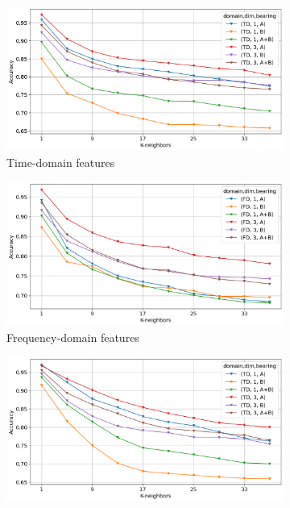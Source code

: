 \begin{figure}[h]
    \centering
    \begin{subfigure}[b]{0.48\textwidth}
        \includegraphics[width=\textwidth]{assets/results/all-features/TD.png}
        \caption{Time-domain features}
    \end{subfigure}
    \hfill
    \begin{subfigure}[b]{0.48\textwidth}
        \includegraphics[width=\textwidth]{assets/results/all-features/FD.png}
        \caption{Frequency-domain features}
    \end{subfigure}
    \hfill
    \begin{subfigure}[b]{0.48\textwidth}
        \includegraphics[width=\textwidth]{assets/results/all-features/TD-severity.png}

\end{subfigure}
\end{figure}
